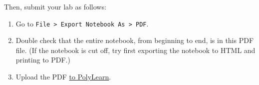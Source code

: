 \documentclass[11pt]{article}
\providecommand{\tightlist}{%
      \setlength{\itemsep}{0pt}\setlength{\parskip}{0pt}}
\begin{document}
Then, submit your lab as follows:

\begin{enumerate}
\def\labelenumi{\arabic{enumi}.}
\tightlist
\item
  Go to
  \texttt{File\ \textgreater{}\ Export\ Notebook\ As\ \textgreater{}\ PDF}.
\item
  Double check that the entire notebook, from beginning to end, is in
  this PDF file. (If the notebook is cut off, try first exporting the
  notebook to HTML and printing to PDF.)
\item
  Upload the PDF
  \href{https://polylearn.calpoly.edu/AY_2018-2019/mod/assign/view.php?id=325688}{to
  PolyLearn}.
\end{enumerate}


    
    
    
    
\end{document}
